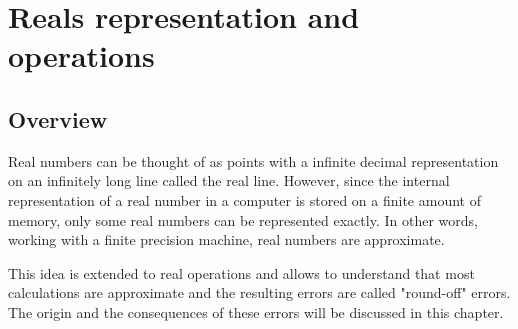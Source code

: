 \renewcommand\home{./Fortran_project/sources/IEEE}

\chapter{Reals representation and operations} \label{chap:reals}
     
\section*{Overview}

Real numbers can be thought of  as points with a infinite decimal representation
on an infinitely long line called the real line. However, since the internal representation of a real number 
in a computer  is stored  on a finite amount of memory, 
only some real numbers can be represented exactly. 
In other words, working with a finite precision machine,  real numbers are approximate.

    


This idea is extended to real operations and allows to understand that most calculations 
are approximate and the resulting errors are called "round-off" errors. 
The origin and the consequences of these errors will be discussed in this chapter. 
%




  
  

